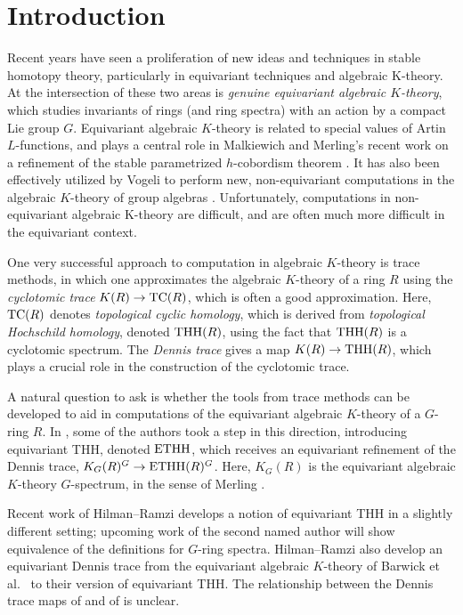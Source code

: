 \section{Introduction}


Recent years have seen a proliferation of new ideas and techniques in stable homotopy theory, particularly in  equivariant techniques and algebraic K-theory.  At the intersection of these two areas is \emph{genuine equivariant algebraic $K$-theory}, which studies invariants of rings (and ring spectra) with an action by a compact Lie group $G$. Equivariant algebraic $K$-theory is related to special values of Artin $L$-functions, and plays a central role in Malkiewich and Merling's recent work on a refinement of the stable parametrized $h$-cobordism theorem \cite{ElmantoZhang,MM1,MM2}. It has also been effectively utilized by Vogeli to perform new, non-equivariant computations in the algebraic $K$-theory of group algebras \cite{Vogeli}. 
Unfortunately, computations in non-equivariant algebraic K-theory are difficult, and are often much more difficult in the equivariant context.

One very successful approach to computation in algebraic $K$-theory is trace methods, in which one approximates the algebraic $K$-theory of a ring $R$ using the \emph{cyclotomic trace} $K(R)\to \mathrm{TC}(R)$, which is often a good approximation.  Here, $\mathrm{TC}(R)$ denotes \emph{topological cyclic homology}, which is derived from \emph{topological Hochschild homology}, denoted $\mathrm{THH}(R)$, using the fact that $\mathrm{THH}(R)$ is a cyclotomic spectrum. The \emph{Dennis trace} gives a map $K(R)\to \mathrm{THH}(R)$, which plays a crucial role in the construction of the cyclotomic trace. 

A natural question to ask is whether the tools from trace methods can be developed to aid in computations of the equivariant algebraic $K$-theory of a $G$-ring $R$. In \cite{CGK25}, some of the authors took a step in this direction, introducing equivariant THH, denoted $\mathrm{ETHH}$, which receives an equivariant refinement of the Dennis trace, $K_G(R)^G\to\mathrm{ETHH}(R)^G$.  Here, $K_G(R)$ is the equivariant algebraic $K$-theory $G$-spectrum, in the sense of Merling \cite{Merling}. 

Recent work of Hilman--Ramzi \cite{HilmanRamzi} develops a notion of equivariant THH in a slightly different setting; upcoming work of the second named author will show equivalence of the definitions for $G$-ring spectra. Hilman--Ramzi also develop an equivariant Dennis trace from the equivariant algebraic $K$-theory of Barwick et al.\ \cite{Bar17, BGS20} to their version of equivariant THH. The relationship between the Dennis trace maps of \cite{HilmanRamzi} and of \cite{CGK25} is unclear.

